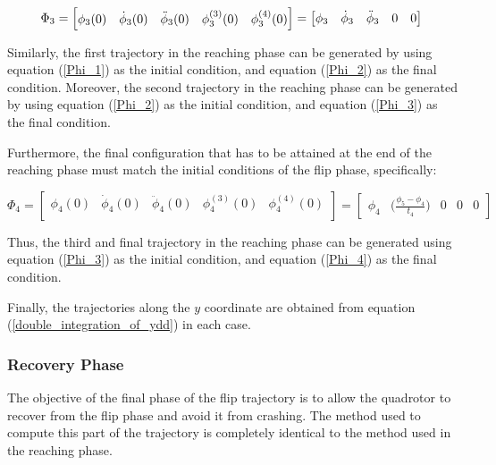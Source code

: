 \documentclass{thesisreport}
\begin{document}
\begin{itemize}
\begin{equation}\label{Phi_3}
	\Phi_3 = \begin{bmatrix}
	\phi_3(0) & \dot{\phi}_3 (0) & \ddot{\phi}_3 (0) & \phi_3^{(3)} (0) & \phi_3^{(4)} (0) \\
	\end{bmatrix} = \begin{bmatrix}
	\phi_3 & \dot{\phi}_3 & \ddot{\phi}_3 & 0 & 0
	\end{bmatrix} \\
\end{equation}

Similarly, the first trajectory in the reaching phase can be generated by using equation (\ref{Phi_1}) as the initial condition, and equation (\ref{Phi_2}) as the final condition. Moreover, the second trajectory in the reaching phase can be generated by using equation (\ref{Phi_2}) as the initial condition, and equation (\ref{Phi_3}) as the final condition.

Furthermore, the final configuration that has to be attained at the end of the reaching phase must match the initial conditions of the flip phase, specifically:

\begin{equation}\label{Phi_4}
	\Phi_4 = \begin{bmatrix}
	\phi_4(0) & \dot{\phi}_4 (0) & \ddot{\phi}_4 (0) & \phi_4^{(3)} (0) & \phi_4^{(4)} (0) \\
	\end{bmatrix} = \begin{bmatrix}
	\phi_4 & \bigg( \frac{\phi_5 - \phi_4}{t_4} \bigg) & 0 & 0 & 0
	\end{bmatrix} 
\end{equation}

Thus, the third and final trajectory in the reaching phase can be generated using equation (\ref{Phi_3}) as the initial condition, and equation (\ref{Phi_4}) as the final condition. 

Finally, the trajectories along the $y$ coordinate are obtained from equation (\ref{double_integration_of_ydd}) in each case.

\end{itemize}


\newpage

\subsubsection*{Recovery Phase}

The objective of the final phase of the flip trajectory is to allow the quadrotor to recover from the flip phase and avoid it from crashing. The method used to compute this part of the trajectory is completely identical to the method used in the reaching phase.
\end{document}
